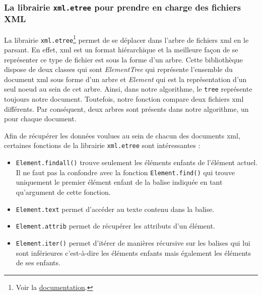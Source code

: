 \documentclass[a4paper, 12pt, twoside]{book}
\begin{document}
\subsubsection{La librairie \texttt{xml.etree} pour prendre en charge des fichiers XML}

La librairie \texttt{xml.etree}\footnote{Voir la \href{https://docs.python.org/3/library/xml.etree.elementtree.html}{documentation}.} permet de se déplacer dans l'arbre de fichiers \gls{xml} en le parsant. En effet, \gls{xml} est un format hiérarchique et la meilleure façon de se représenter ce type de fichier est sous la forme d'un arbre. Cette bibliothèque dispose de deux classes qui sont \textit{ElementTree} qui représente l'ensemble du document \gls{xml} sous forme d'un arbre et \textit{Element} qui est la représentation d'un seul noeud au sein de cet arbre. Ainsi, dans notre algorithme, le \texttt{tree} représente toujours notre document. Toutefois, notre fonction compare deux fichiers \gls{xml} différents. Par conséquent, deux arbres sont présents dans notre algorithme, un pour chaque document. 

Afin de récupérer les données voulues au sein de chacun des documents \gls{xml}, certaines fonctions de la librairie \texttt{xml.etree} sont intéressantes :
\begin{itemize}
    \item \texttt{Element.findall()} trouve seulement les éléments enfants de l'élément actuel. Il ne faut pas la confondre avec la fonction \texttt{Element.find()} qui trouve uniquement le premier élément enfant de la balise indiquée en tant qu'argument de cette fonction. 
    \item \texttt{Element.text} permet d'accéder au texte contenu dans la balise.
    \item \texttt{Element.attrib} permet de récupérer les attributs d'un élément.
    \item \texttt{Element.iter()} permet d'itérer de manières récursive sur les balises qui lui sont inférieures c'est-à-dire les éléments enfants mais également les éléments de ses enfants. 
\end{itemize}
\end{document}
